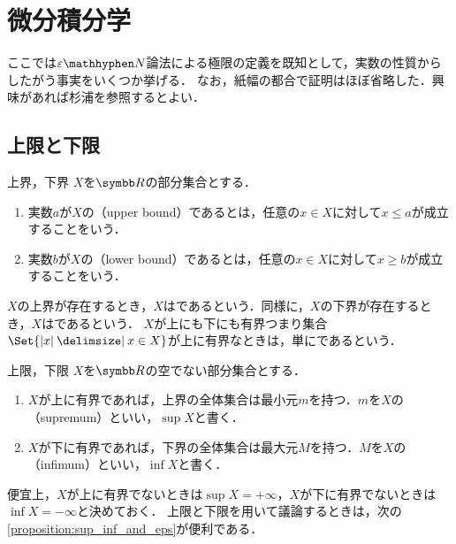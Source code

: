 \documentclass[../../main]{subfiles}
\begin{document}
\section{微分積分学}

ここでは\(\varepsilon\mathhyphen N\)論法による極限の定義を既知として，実数の性質からしたがう事実をいくつか挙げる．
なお，紙幅の都合で証明はほぼ省略した．興味があれば杉浦\cite{sugiura2018}を参照するとよい．

\subsection{上限と下限}

\begin{definition}{上界，下界}{}
  \(X\)を\(\numset{R}\)の部分集合とする．
  \begin{enumerate}
    \item 実数\(a\)が\(X\)の（upper bound）であるとは，任意の\(x\in X\)に対して\(x\leq a\)が成立することをいう．
    \item 実数\(b\)が\(X\)の（lower bound）であるとは，任意の\(x\in X\)に対して\(x\geq b\)が成立することをいう．
  \end{enumerate}
\end{definition}

\(X\)の上界が存在するとき，\(X\)はであるという．同様に，\(X\)の下界が存在するとき，\(X\)はであるという．
\(X\)が上にも下にも有界\texttwoemdash つまり集合\(\Set{\abs{x}\given x\in X}\)が上に有界\texttwoemdash なときは，単にであるという．

\begin{definition}{上限，下限}{}
  \(X\)を\(\numset{R}\)の空でない部分集合とする．
  \begin{enumerate}
    \item \(X\)が上に有界であれば，上界の全体集合は最小元\(m\)を持つ．\(m\)を\(X\)の（supremum）といい，\(\sup X\)と書く．
    \item \(X\)が下に有界であれば，下界の全体集合は最大元\(M\)を持つ．\(M\)を\(X\)の（infimum）といい，\(\inf X\)と書く．
  \end{enumerate}
\end{definition}

便宜上，\(X\)が上に有界でないときは\(\sup X=+\infty\)，\(X\)が下に有界でないときは\(\inf X=-\infty\)と決めておく．
上限と下限を用いて議論するときは，次の\cref{proposition:sup_inf_and_eps}が便利である．
\end{document}
